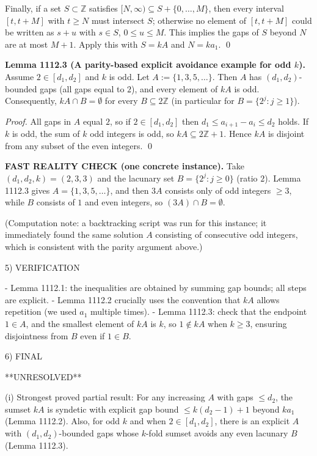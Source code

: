 Finally, if a set \(S\subset\mathbb{Z}\) satisfies \([N,\infty)\subseteq S+\{0,\dots,M\}\), then every interval \([t,t+M]\) with \(t\ge N\) must intersect \(S\); otherwise no element of \([t,t+M]\) could be written as \(s+u\) with \(s\in S\), \(0\le u\le M\). This implies the gaps of \(S\) beyond \(N\) are at most \(M+1\). Apply this with \(S=kA\) and \(N=k a_1\). \qed

\textbf{Lemma 1112.3 (A parity-based explicit avoidance example for odd \(k\)).}
Assume \(2\in[d_1,d_2]\) and \(k\) is odd. Let
\(A:=\{1,3,5,\dots\}\). Then \(A\) has \((d_1,d_2)\)-bounded gaps (all gaps equal to \(2\)), and every element of \(kA\) is odd. Consequently, \(kA\cap B=\emptyset\) for every \(B\subseteq 2\mathbb{Z}\) (in particular for \(B=\{2^j:j\ge 1\}\)).

\emph{Proof.}
All gaps in \(A\) equal \(2\), so if \(2\in[d_1,d_2]\) then \(d_1\le a_{i+1}-a_i\le d_2\) holds.
If \(k\) is odd, the sum of \(k\) odd integers is odd, so \(kA\subseteq 2\mathbb{Z}+1\). Hence \(kA\) is disjoint from any subset of the even integers. \qed

\textbf{FAST REALITY CHECK (one concrete instance).}
Take \((d_1,d_2,k)=(2,3,3)\) and the lacunary set \(B=\{2^j:j\ge 0\}\) (ratio \(2\)). Lemma 1112.3 gives \(A=\{1,3,5,\dots\}\), and then \(3A\) consists only of odd integers \(\ge 3\), while \(B\) consists of \(1\) and even integers, so \((3A)\cap B=\emptyset\).

(Computation note: a backtracking script was run for this instance; it immediately found the same solution \(A\) consisting of consecutive odd integers, which is consistent with the parity argument above.)

5) VERIFICATION

- Lemma 1112.1: the inequalities are obtained by summing gap bounds; all steps are explicit.
- Lemma 1112.2 crucially uses the convention that \(kA\) allows repetition (we used \(a_1\) multiple times).
- Lemma 1112.3: check that the endpoint \(1\in A\), and the smallest element of \(kA\) is \(k\), so \(1\notin kA\) when \(k\ge 3\), ensuring disjointness from \(B\) even if \(1\in B\).

6) FINAL

**UNRESOLVED**

(i) Strongest proved partial result: For any increasing \(A\) with gaps \(\le d_2\), the sumset \(kA\) is syndetic with explicit gap bound \(\le k(d_2-1)+1\) beyond \(k a_1\) (Lemma 1112.2). Also, for odd \(k\) and when \(2\in[d_1,d_2]\), there is an explicit \(A\) with \((d_1,d_2)\)-bounded gaps whose \(k\)-fold sumset avoids any even lacunary \(B\) (Lemma 1112.3).

